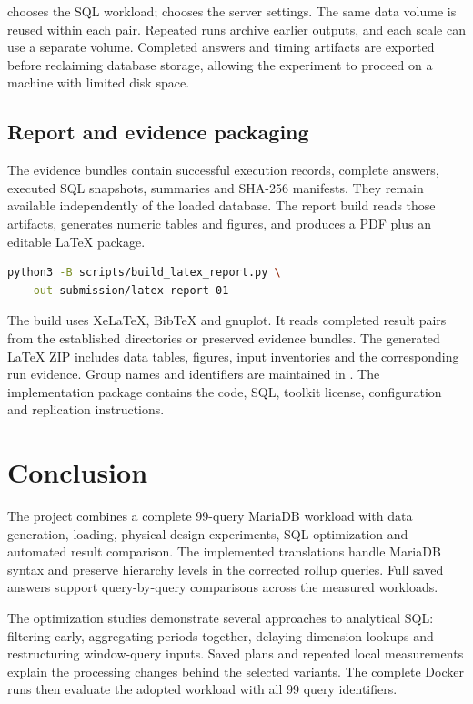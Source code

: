 \documentclass[11pt,a4paper]{article}
\DeclareRobustCommand{\file}[1]{\path{#1}}
\begin{document}
\file{QUERYSET} chooses the SQL workload; \file{TUNED} chooses the server
settings. The same data volume is reused within each pair. Repeated runs
archive earlier outputs, and each scale can use a separate volume. Completed
answers and timing artifacts are exported before reclaiming database storage,
allowing the experiment to proceed on a machine with limited disk space.

\subsection{Report and evidence packaging}
The evidence bundles contain successful execution records, complete answers,
executed SQL snapshots, summaries and SHA-256 manifests. They remain available
independently of the loaded database. The report build reads those artifacts,
generates numeric tables and figures, and produces a PDF plus an editable
LaTeX package.

\begin{lstlisting}[language=bash]
python3 -B scripts/build_latex_report.py \
  --out submission/latex-report-01
\end{lstlisting}

The build uses XeLaTeX, BibTeX and gnuplot. It reads completed result pairs
from the established directories or preserved evidence bundles. The generated
LaTeX ZIP includes data tables, figures, input inventories and the corresponding
run evidence. Group names and identifiers are maintained in
\file{report/latex/metadata.tex}. The implementation package contains the code,
SQL, toolkit license, configuration and replication instructions.

\section{Conclusion}
The project combines a complete 99-query MariaDB workload with data generation,
loading, physical-design experiments, SQL optimization and automated result
comparison. The implemented translations handle MariaDB syntax and preserve
hierarchy levels in the corrected rollup queries. Full saved answers support
query-by-query comparisons across the measured workloads.

The optimization studies demonstrate several approaches to analytical SQL:
filtering early, aggregating periods together, delaying dimension lookups and
restructuring window-query inputs. Saved plans and repeated local measurements
explain the processing changes behind the selected variants. The complete
Docker runs then evaluate the adopted workload with all 99 query identifiers.
\end{document}
